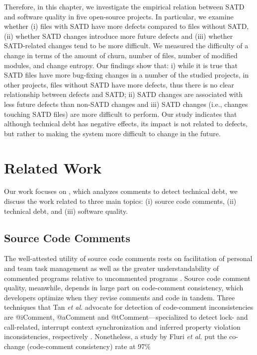 Therefore, in this chapter, we investigate the empirical relation between SATD and software quality in five open-source projects. In particular, we examine whether (i) files with SATD have more defects compared to files without SATD, (ii) whether SATD changes introduce more future defects and (iii) whether SATD-related changes tend to be more difficult. We measured the difficulty of a change in terms of the amount of churn, number of files, number of modified modules, and change entropy. Our findings show that: i) while it is true that SATD files have more bug-fixing changes in a number of the studied projects, in other projects, files without SATD have more defects, thus there is no clear relationship between defects and SATD; ii) SATD changes are associated with less future defects than non-SATD changes and iii) SATD changes (i.e., changes touching SATD files) are more difficult to perform. Our study indicates that although technical debt has negative effects, its impact is not related to defects, but rather to making the system more difficult to change in the future.


\section{Related Work}
\label{chap3:sec:related_work}
Our work focuses on \SATD, which analyzes comments to detect technical debt, we discuss the work related to three main topics: (i) source code comments, (ii) technical debt, and (iii) software quality.

\subsection{Source Code Comments}
The well-attested utility of source code comments rests on facilitation of personal and team task management as well as the greater understandability of commented programs relative to uncommented programs \cite{lawrie2006leveraged, Storey:2008, TakangGM96,tan07icomment}. Source code comment quality, meanwhile, depends in large part on code-comment consistency, which developers optimize when they revise comments and code in tandem. Three techniques that Tan \textit{et al.} advocate for detection of code-comment inconsistencies are @iComment, @aComment and @tComment---specialized to detect lock- and call-related, interrupt context synchronization and inferred property violation inconsistencies, respectively \cite{tan07icomment, acomment, tcomment}. Nonetheless, a study by Fluri \textit{et al.} put the co-change (code-comment consistency) rate at 97\%

